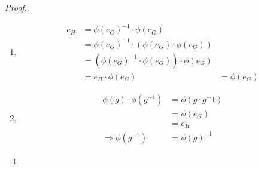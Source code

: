 \documentclass{article}
\begin{document}
\begin{proof}\leavevmode
    \begin{enumerate}
        \item \begin{align*}
            e_H &= \phi(e_G)^{-1} \cdot \phi(e_G) \\
            &= \phi(e_G)^{-1} \cdot (\phi(e_G) \cdot \phi(e_G)) \tag{homomorphism property}\\
            &= (\phi(e_G)^{-1} \cdot \phi(e_G)) \cdot \phi(e_G) \\
            &= e_H \cdot \phi(e_G)
            &= \phi(e_G)
        \end{align*}
        \item \begin{align*}
            \phi(g) \cdot \phi(g^{-1}) &= \phi(g \cdot g^-1) \tag{homomorphism property} \\
            &= \phi(e_G) \\
            &= e_H \\
            \Rightarrow \phi(g^{-1}) &= \phi(g)^{-1}
        \end{align*}
    \end{enumerate}
\end{proof}

\end{document}
